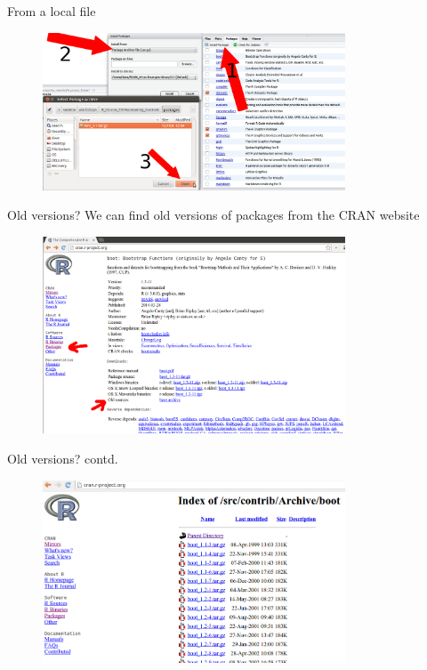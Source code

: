 \documentclass{beamer}\usepackage[]{graphicx}\usepackage[]{color}
\begin{document}
\begin{frame}[fragile]{From a local file}
\begin{figure}[ht!]
\centering
\includegraphics[width=90mm]{pictures/package_install_local.png}
\label{overflow}
\end{figure}
\end{frame}


\begin{frame}[fragile]{Old versions?}
We can find old versions of packages from the CRAN website
\begin{figure}[ht!]
\centering
\includegraphics[width=90mm]{pictures/cran_old_package_versions2.png}
\label{overflow}
\end{figure}
\end{frame}

\begin{frame}[fragile]{Old versions? contd.}
\begin{figure}[ht!]
\centering
\includegraphics[width=90mm]{pictures/cran_old_package_versions_boot.png}
\label{overflow}
\end{figure}
\end{frame}
\end{document}
